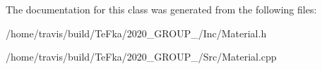 The documentation for this class was generated from the following files\+:\begin{DoxyCompactItemize}
\item 
/home/travis/build/\+Te\+Fka/2020\+\_\+\+G\+R\+O\+U\+P\+\_/\+Inc/Material.\+h\item 
/home/travis/build/\+Te\+Fka/2020\+\_\+\+G\+R\+O\+U\+P\+\_/\+Src/Material.\+cpp\end{DoxyCompactItemize}
